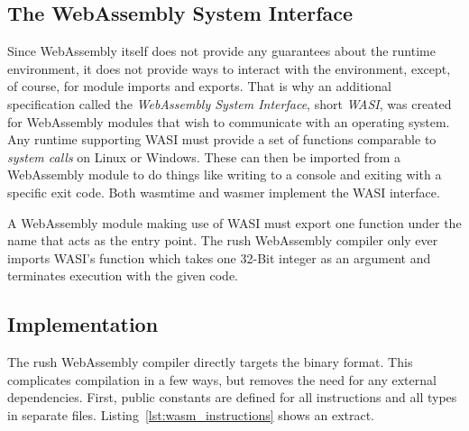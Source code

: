 
\subsection{The WebAssembly System Interface}

Since WebAssembly itself does not provide any guarantees about the runtime environment, it does not provide ways to interact with the environment, except, of course, for module imports and exports.
That is why an additional specification called the \emph{WebAssembly System Interface}, short \emph{WASI}, was created for WebAssembly modules that wish to communicate with an operating system.
Any runtime supporting WASI must provide a set of functions comparable to \emph{system calls} on Linux or Windows.
These can then be imported from a WebAssembly module to do things like writing to a console and exiting with a specific exit code.
Both wasmtime and wasmer implement the WASI interface.

A WebAssembly module making use of WASI must export one function under the name  that acts as the entry point.
The rush WebAssembly compiler only ever imports WASI's  function which takes one 32-Bit integer as an argument and terminates execution with the given code.


\subsection{Implementation}


The rush WebAssembly compiler directly targets the binary format.
This complicates compilation in a few ways, but removes the need for any external dependencies.
First, public constants are defined for all instructions and all types in separate files.
Listing~\ref{lst:wasm_instructions} shows an extract.

